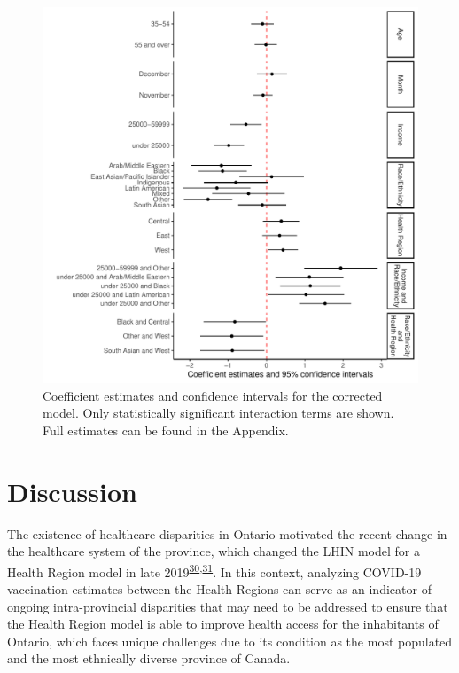 \documentclass[
  letterpaper,
  DIV=11,
  numbers=noendperiod]{scrartcl}
\begin{document}
\begin{figure}

\includegraphics{main_files/figure-pdf/fig-model-corr-1.pdf} \hfill{}

\caption{\label{fig-model-corr}Coefficient estimates and confidence
intervals for the corrected model. Only statistically significant
interaction terms are shown. Full estimates can be found in the
Appendix.}

\end{figure}

\hypertarget{discussion}{%
\section{Discussion}\label{discussion}}

The existence of healthcare disparities in Ontario motivated the recent
change in the healthcare system of the province, which changed the LHIN
model for a Health Region model in late
2019\textsuperscript{\protect\hyperlink{ref-tsasis2012}{30},\protect\hyperlink{ref-dong2022}{31}}.
In this context, analyzing COVID-19 vaccination estimates between the
Health Regions can serve as an indicator of ongoing intra-provincial
disparities that may need to be addressed to ensure that the Health
Region model is able to improve health access for the inhabitants of
Ontario, which faces unique challenges due to its condition as the most
populated and the most ethnically diverse province of Canada.
\end{document}
